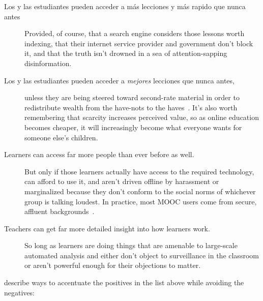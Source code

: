 \begin{description}

\item[Los y las estudiantes pueden acceder a más lecciones y más rapido que nunca antes]
  Provided,
  of course,
  that a search engine considers those lessons worth indexing,
  that their internet service provider and government don't block it,
  and that the truth isn't drowned in a sea of attention-sapping disinformation.

\item[Los y las estudiantes pueden acceder a \emph{mejores} lecciones que nunca antes,]
  unless they are being steered toward second-rate material
  in order to redistribute wealth from the have-nots to the haves~\cite{McMi2017}.
  It's also worth remembering that scarcity increases perceived value,
  so as online education becomes cheaper,
  it will increasingly become what everyone wants for someone else's children.

\item[Learners can access far more people than ever before as well.]
  But only if those learners actually have access to the required technology,
  can afford to use it,
  and aren't driven offline by harassment or marginalized
  because they don't conform to the social norms of whichever group is talking loudest.
  In practice,
  most MOOC users come from secure, affluent backgrounds~\cite{Hans2015}.

\item[Teachers can get far more detailed insight into how learners work.]
  So long as learners are doing things that are amenable to large-scale automated analysis
  and either don't object to surveillance in the classroom
  or aren't powerful enough for their objections to matter.

\end{description}

\cite{Marg2015,Mill2016a,Nils2017} describe ways to accentuate the positives in the list above
while avoiding the negatives:


